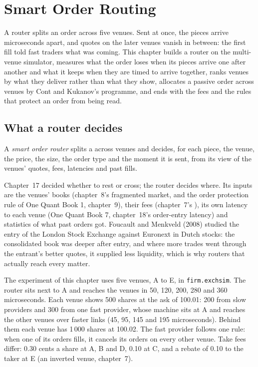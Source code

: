 \chapter{Smart Order Routing}\label{ch:mx:smart-order-routing}

A router splits an order across five venues. Sent at once, the pieces arrive microseconds apart, and quotes on the later venues vanish in between:
the first fill told fast traders what was coming. This chapter builds a router on the multi-venue simulator, measures what the order loses when its
pieces arrive one after another and what it keeps when they are timed to arrive together, ranks venues by what they deliver rather than what they
show, allocates a passive order across venues by Cont and Kukanov's programme, and ends with the fees and the rules that protect an order from being
read.

\section{What a router decides}

\begin{definition}\label{def:mx:smart-order-routing:sor}
A \emph{smart order router} splits a  across venues and decides, for each piece, the venue, the price, the size,
the order type and the moment it is sent, from its view of the venues' quotes, fees, latencies and past fills.
\end{definition}

Chapter~17 decided whether to rest or cross; the router decides where. Its inputs are the venues' books (chapter~8's fragmented market,  and the order protection rule of One Quant Book 1, chapter~9), their fees (chapter~7's ), its own latency to each venue
(One Quant Book 7, chapter~18's order-entry latency) and statistics of what past orders got. Foucault and Menkveld (2008) studied the entry of the
London Stock Exchange against Euronext in Dutch stocks: the consolidated book was deeper after entry, and where more trades went through the entrant's
better quotes, it supplied less liquidity, which is why routers that actually reach every  matter.

The experiment of this chapter uses five venues, A to E, in \texttt{firm.exchsim}. The router sits next to A and reaches the venues in 50, 120, 200,
280 and 360 microseconds. Each venue shows 500 shares at the ask of 100.01: 200 from slow providers and 300 from one fast provider, whose machine sits
at A and reaches the other venues over faster links (45, 95, 145 and 195 microseconds). Behind them each venue has 1\,000 shares at 100.02. The
fast provider follows one rule: when one of its orders fills, it cancels its orders on every other venue. Take fees differ: 0.30 cents a share at A,
B and D, 0.10 at C, and a rebate of 0.10 to the taker at E (an inverted venue, chapter~7).

